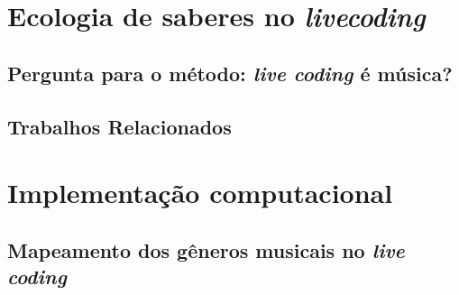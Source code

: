 \documentclass[
	12pt,				%
	openright,			%
	twoside,			%
	a4paper,			%
	english,			%
	french,				%
	spanish,			%
        italian,                        %
	brazil				%
	]{abntex2}
\begin{document}

%
\tableofcontents*
\cleardoublepage
\textual



\part{Ecologia de saberes no \emph{livecoding}}\label{parte1}

\chapter{Pergunta para o método: \emph{live coding} é música?}\label{cap:introducao}



\chapter{Trabalhos Relacionados}\label{cap:trabalhos_relacionados}


\part{Implementação computacional}\label{parte2}

\chapter{Mapeamento dos gêneros musicais no \emph{live coding}}\label{cap:resultados}


\end{document}

